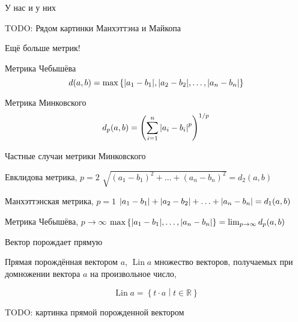\documentclass[14pt,xcolor=dvipsnames]{beamer}
\DeclareMathOperator{\Lin}{\mathrm{Lin}}
\newcommand\R{\mathbb{R}}
\begin{document}
\begin{frame}{У нас и у них}

 \begin{block}{TODO:}
 Рядом картинки Манхэттэна и Майкопа
 \end{block}

\end{frame}


\begin{frame}{Ещё больше метрик!}
\begin{block}{Метрика Чебышёва}
  \[
      d(a, b) = \max\left\{\abs{a_1 - b_1}, \abs{a_2 - b_2}, \ldots, \abs{a_n - b_n}\right\}
  \]
\end{block}
  
\begin{block}{Метрика Минковского}
  \[
      d_p(a, b) = \left(\sum_{i=1}^n\abs{a_i - b_i}^p\right)^{1/p}
  \]
\end{block}
\end{frame}

\begin{frame}{Частные случаи метрики Минковского}

\begin{block}{Евклидова метрика, $p=2$}
$
  \sqrt{(a_1 - b_1)^2 + \ldots + (a_n - b_n)^2} = d_2(a, b)
$
\end{block}

\begin{block}{Манхэттэнская метрика, $p=1$}
$
    \abs{a_1 - b_1}  + \abs{a_2 - b_2} + \ldots + \abs{a_n - b_n} = d_1(a, b)
$
\end{block}
  
\begin{block}{Метрика Чебышёва, $p\to \infty$}
$
    \max\left\{\abs{a_1 - b_1}, \ldots, \abs{a_n - b_n}\right\} = \lim_{p\to\infty} d_p(a, b)
$
\end{block}
\end{frame}

\begin{frame}{Вектор порождает прямую}

\begin{block}{Прямая порождённая вектором $a$, $\Lin a$}
множество векторов, получаемых при домножении вектора $a$ на произвольное число,
\end{block}
\[
\Lin a = \left\{t\cdot a \middle| t \in \R \right\}  
\]

\begin{block}{TODO: картинка прямой порожденной вектором}
\end{block}

\end{frame}
\end{document}
